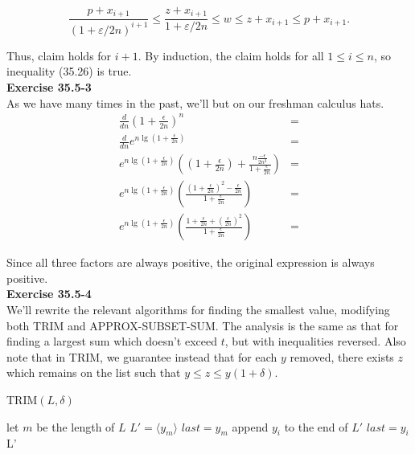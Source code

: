 \documentclass{article}
\begin{document}
\[ \frac{p + x_{i+1}}{(1+\varepsilon/2n)^{i+1}} \leq \frac{z + x_{i+1}}{1 + \varepsilon/2n} \leq w \leq z + x_{i+1} \leq p + x_{i+1}.\]

Thus, claim holds for $i+1$. By induction, the claim holds for all $1 \leq i \leq n$, so inequality (35.26) is true. \\


\noindent\textbf{Exercise 35.5-3}\\

As we have many times in the past, we'll but on our freshman calculus hats. 
\begin{align*}
\frac{d}{dn} \left( 1+ \frac{\epsilon}{2n}\right)^n&=\\
\frac{d}{dn} e^{n\lg\left( 1+ \frac{\epsilon}{2n}\right)}&=\\
e^{n\lg\left( 1+ \frac{\epsilon}{2n}\right)}\left(\left( 1+ \frac{\epsilon}{2n}\right) + \frac{n\frac{-\epsilon}{2n^2}}{1 + \frac{\epsilon}{2n}}\right)&=\\
e^{n\lg\left( 1+ \frac{\epsilon}{2n}\right)}\left(\frac{\left( 1+ \frac{\epsilon}{2n}\right)^2  - \frac{\epsilon}{2n}}{1 + \frac{\epsilon}{2n}}\right)&=\\
e^{n\lg\left( 1+ \frac{\epsilon}{2n}\right)}\left(\frac{ 1+ \frac{\epsilon}{2n}+ \left(\frac{\epsilon}{2n}\right)^2  }{1 + \frac{\epsilon}{2n}}\right)&=\end{align*}

Since all three factors are always positive, the original expression is always positive.\\

\noindent\textbf{Exercise 35.5-4}\\

We'll rewrite the relevant algorithms for finding the smallest value, modifying both TRIM and APPROX-SUBSET-SUM.  The analysis is the same as that for finding a largest sum which doesn't exceed $t$, but with inequalities reversed.  Also note that in TRIM, we guarantee instead that for each $y$ removed, there exists $z$ which remains on the list such that $y \leq z \leq y(1+\delta)$.\\

\begin{algorithm}
\caption{TRIM$(L,\delta)$}
\begin{algorithmic}[1]
\State let $m$ be the length of $L$
\State $L' = \langle y_m \rangle$
\State $last = y_m$
		\State append $y_i$ to the end of $L'$
		\State $last = y_i$
	\EndIf
\EndFor
\State \Return L'
\end{algorithmic}
\end{algorithm}
\end{document}
